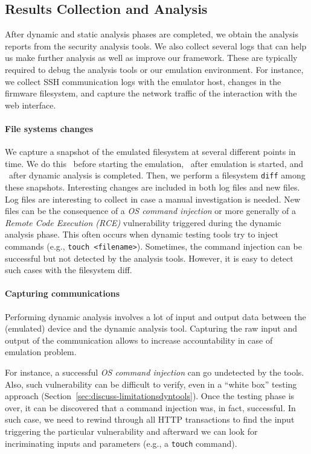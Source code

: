 \documentclass[conference]{./templates/ndss/IEEEtran}
\newcounter{t0d0_counter}
\newcounter{pr00f_counter}
\begin{document}
\subsection{Results Collection and Analysis}
\label{sec:results-collect-analysis}


After dynamic and static analysis phases are completed, we obtain the
analysis reports from the security analysis tools. 
We also collect several logs that can help us make
further analysis as well as improve our framework.  These are
typically required to debug the analysis tools or our emulation
environment.  For instance, we collect SSH communication logs with the
emulator host,
changes in the firmware filesystem, and capture the network traffic
of the interaction with the web interface.

\paragraph{File systems changes}
\label{sec:dyn-our-capt-fs}
We capture a snapshot of the emulated filesystem at several different 
points in time. We do this ~before starting the emulation, 
~after emulation is started, and ~after dynamic analysis is completed. 
Then, we perform a filesystem \texttt{diff} among these snapshots.
Interesting changes are included in both log files and new files. Log files
are interesting to collect in case a manual investigation is needed.
New files can be the consequence of a \emph{OS command injection} or
more generally of a \emph{Remote Code Execution (RCE)} vulnerability
triggered during the dynamic analysis phase. This often occurs when
dynamic testing tools try to inject commands (e.g., \texttt{touch
  <filename>}). Sometimes, the command injection can be successful but not
detected by the analysis tools. However, it is easy to detect such cases with the filesystem 
diff.



\paragraph{Capturing communications}
\label{sec:dyn-our-capt-tcpdump}

Performing dynamic analysis involves a lot of input and output data 
between the (emulated) device and the dynamic analysis tool. 
Capturing the raw input and output of the communication allows to
increase accountability in case of emulation problem.

For instance, a successful \emph{OS command injection} can go undetected by the 
tools. Also, such vulnerability can be difficult to verify, 
even in a ``white box'' testing approach (Section~\ref{sec:discuss-limitationsdyntools}).
Once the testing phase is over,
it can be discovered that 
a command injection was, in fact, successful. 
In such case, we need to rewind through all HTTP transactions
to find the input triggering the particular vulnerability and afterward we can
look for incriminating inputs and parameters (e.g., a \texttt{touch} 
command).
\end{document}
